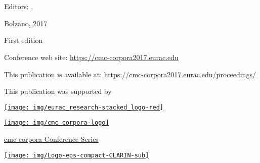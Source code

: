 \documentclass[usegeometry]{scrbook}
\title{\thetitle}
\begin{document}
\dominitoc
\pagestyle{scrheadings}

\frontmatter

\subject{Conference Proceedings}
\title{\thetitle}
\subtitle{3-4 October 2017, Eurac Research, Italy}

\author{}
\publishers{Editors \\ \authora \\ \authorb}
\date{}

\maketitle
\clearpage

\section*{\thetitle}
\noindent
Editors: \authora, \authorb

\bigskip
\noindent
Bolzano, 2017

\smallskip
\noindent
First edition

\bigskip 

\noindent
Conference web site:
\href{https://cmc-corpora2017.eurac.edu}{https://cmc-corpora2017.eurac.edu}

\smallskip
\noindent
This publication is available at:
\href{https://cmc-corpora2017.eurac.edu/proceedings/}{https://cmc-corpora2017.eurac.edu/proceedings/}

\vfill

This publication was supported by

\noindent
\begin{minipage}{.33\textwidth}%
    \center
    \href{http://www.eurac.edu}{\texttt{[image: img/eurac\_research-stacked\_logo-red]}}
\end{minipage}%
\begin{minipage}{.33\textwidth}%
    \center
    \href{http://cmc-corpora.org}{\texttt{[image: img/cmc\_corpora-logo]}}

    \smallskip 
    {\small \href{http://cmc-corpora.org}{cmc-corpora Conference Series}}
\end{minipage}
\begin{minipage}{.33\textwidth}%
    \center
    \href{https://www.clarin.eu}{\texttt{[image: img/Logo-eps-compact-CLARIN-sub]}}
\end{minipage}
\end{document}
